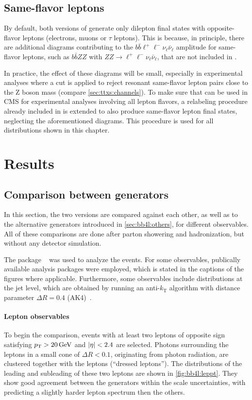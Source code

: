 \subsection{Same-flavor leptons}
\label{sec:bb4l:sameflavor}

By default, both versions of \bbfourl generate only dilepton final states with opposite-flavor leptons (electrons, muons or $\tau$ leptons). This is because, in principle, there are additional diagrams contributing to the $b \bar{b} \ell^+ \ell^- \nu_\ell \bar{\nu}_\ell$ amplitude for same-flavor leptons, such as $b \bar{b} ZZ$ with $ZZ \rightarrow \ell^+ \ell^- \nu_\ell \bar{\nu}_\ell$, that are not included in \bbfourl.

In practice, the effect of these diagrams will be small, especially in experimental analyses where a cut is applied to reject resonant same-flavor lepton pairs close to the Z boson mass (compare \cref{sec:ttxs:channels}). To make sure that \bbfourl can be used in CMS for experimental analyses involving all lepton flavors, a relabeling procedure already included in \bbfourl is extended to also produce same-flavor lepton final states, neglecting the aforementioned diagrams. This procedure is used for all \bbfourl distributions shown in this chapter.

\section{Results}

\subsection{Comparison between generators}

In this section, the two \bbfourl versions are compared against each other, as well as to the alternative generators introduced in \cref{sec:bb4l:others}, for different observables. All of these comparisons are done after parton showering and hadronization, but without any detector simulation.

The package \rivet~\cite{Rivet:2019rhm} was used to analyze the events. For some observables, publically available analysis packages were employed, which is stated in the captions of the figures where applicable. Furthermore, some observables include distributions at the jet level, which are obtained by running an anti-$k_\mathrm{T}$ algorithm with distance parameter $\Delta R = 0.4$ (AK4)~\cite{Cacciari:2008gp}.

\paragraph{Lepton observables} To begin the comparison, events with at least two leptons of opposite sign satisfying $\pt > \SI{20}{\GeV}$ and $|\eta| < 2.4$ are selected. Photons surrounding the leptons in a small cone of $\Delta R < 0.1$, originating from photon radiation, are clustered together with the leptons (``dressed leptons''). The \pt distributions of the leading and subleading of these two leptons are shown in \cref{fig:bb4l:leppt}. They show good agreement between the generators within the scale uncertainties, with \tttWsum predicting a slightly harder lepton spectrum then the others.

